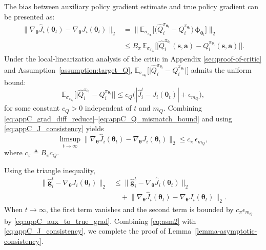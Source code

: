 \documentclass{IEEEtran}
\begin{document}
The bias between auxiliary policy gradient estimate and true policy gradient can be presented as: 
\begin{align}
\big\|\nabla_{\boldsymbol{\theta}}\hat{J}_i(\boldsymbol{\theta}_t)-\nabla_{\boldsymbol{\theta}}J_i(\boldsymbol{\theta}_t)\big\|_2
&=\Big\|\mathbb{E}_{\sigma_{\pi_{\boldsymbol{\theta}_t}}}\big[\big(\hat{Q}_i^{\pi_{\boldsymbol{\theta}_t}}-Q_i^{\pi_{\boldsymbol{\theta}_t}}\big)\,\boldsymbol{\phi}_{\boldsymbol{\theta}_t}\big]\Big\|_2 \nonumber\\
&\le B_{\pi}\,\mathbb{E}_{\sigma_{\pi_{\boldsymbol{\theta}_t}}}\Big[\big|\hat{Q}_i^{\pi_{\boldsymbol{\theta}_t}}(\boldsymbol{s},\boldsymbol{a})-Q_i^{\pi_{\boldsymbol{\theta}_t}}(\boldsymbol{s},\boldsymbol{a})\big|\Big].
\label{eq:appC_grad_diff_reduce}
\end{align}
Under the local-linearization analysis of the critic in Appendix \ref{sec:proof-of-critic} and Assumption~\ref{assumption:target_Q}, $\mathbb{E}_{\sigma_{\pi_{\boldsymbol{\theta}_t}}}\Big[\big|\hat{Q}_i^{\pi_{\boldsymbol{\theta}_t}}-Q_i^{\pi_{\boldsymbol{\theta}_t}}\big|\Big]$ admits the uniform bound: 
\begin{equation}
\mathbb{E}_{\sigma_{\pi_{\boldsymbol{\theta}_t}}}\Big[\big|\hat{Q}_i^{\pi_{\boldsymbol{\theta}_t}}-Q_i^{\pi_{\boldsymbol{\theta}_t}}\big|\Big]
\le c_Q\Big(|\hat{J}_i^t-J_i(\boldsymbol{\theta}_t)|+\epsilon_{m_Q}\Big),
\label{eq:appC_Q_mismatch_bound}
\end{equation}
for some constant $c_Q>0$ independent of $t$ and $m_Q$.
Combining \eqref{eq:appC_grad_diff_reduce}--\eqref{eq:appC_Q_mismatch_bound} and using \eqref{eq:appC_J_consistency} yields
\begin{equation}
\limsup_{t\to\infty}\big\|\nabla_{\boldsymbol{\theta}}\hat{J}_i(\boldsymbol{\theta}_t)-\nabla_{\boldsymbol{\theta}}J_i(\boldsymbol{\theta}_t)\big\|_2
\le c_{\pi}\,\epsilon_{m_Q},
\label{eq:appC_aux_to_true_grad}
\end{equation}
where $c_{\pi}\triangleq B_{\pi}c_Q$.

Using the triangle inequality,
\begin{equation}
\begin{aligned}
\big\|\hat{\boldsymbol{g}}_i^{t}-\nabla_{\boldsymbol{\theta}}J_i(\boldsymbol{\theta}_t)\big\|_2
&\le \big\|\hat{\boldsymbol{g}}_i^{t}-\nabla_{\boldsymbol{\theta}}\hat{J}_i(\boldsymbol{\theta}_t)\big\|_2 \\
&\quad + \big\|\nabla_{\boldsymbol{\theta}}\hat{J}_i(\boldsymbol{\theta}_t)-\nabla_{\boldsymbol{\theta}}J_i(\boldsymbol{\theta}_t)\big\|_2.
\end{aligned}
\label{eq:asm2}
\end{equation}
When $t\to\infty$, the first term vanishes and the second term is bounded by $c_{\pi}\epsilon_{m_Q}$ by \eqref{eq:appC_aux_to_true_grad}.
Combining \eqref{eq:asm2} with \eqref{eq:appC_J_consistency}, we complete the proof of Lemma~\ref{lemma-asymptotic-consistency}. 
\end{document}
